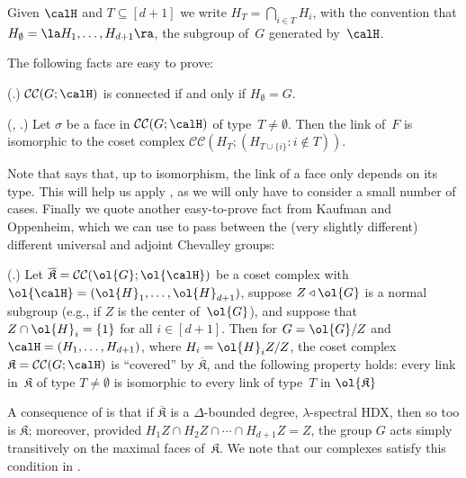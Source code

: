 \documentclass[11pt]{article}
\newcommand{\knote}[1]{}
\newcommand{\CC}[2]{\mathcal{C}\mathcal{C}(#1;#2)}
\newcommand{\complex}{\mathfrak{K}}
\begin{document}
\begin{definition}
    Given $\calH$ and $T \subseteq [d+1]$ we write $H_T = \bigcap_{i \in T} H_i$, with the convention that $H_\emptyset = \la H_1, \dots, H_{d+1} \ra$, the subgroup of~$G$ generated by~$\calH$.
\end{definition}
The following facts are easy to prove:
\begin{fact}                                        \label{fact:connected}
    (\cite{AH93}.)
    $\CC{G}{\calH}$ is connected  if and only if $H_\emptyset = G$.
\end{fact}
\begin{fact}                                        \label{fact:link}
    (\cite[p.~13]{Gar79}, \cite{HS19}.)
    Let $\sigma$ be a face in $\CC{G}{\calH}$ of type~$T \neq \emptyset$.
    Then the link of~$F$ is isomorphic to the coset complex $\CC{H_T}{(H_{T \cup \{i\}} : i \not \in T)}$.
\end{fact}
Note that  says that, up to isomorphism, the link of a face only depends on its type. This will help us apply , as we will only have to consider a small number of cases.
Finally we quote another easy-to-prove fact from Kaufman and Oppenheim, which we can use to pass between the (very slightly different) different universal and adjoint Chevalley groups:
\begin{fact}                                     \label{fact:ko2.4}
    (\cite[essentially Prop.~2.12]{KO18}.)
    Let $\overline{\complex} = \CC{\ol{G}}{\ol{\calH}}$ be a coset complex with $\ol{\calH} = (\ol{H}_1, \dots, \ol{H}_{d+1})$, suppose $Z \triangleleft \ol{G}$ is a normal subgroup (e.g., if $Z$ is the center of~$\ol{G}$), and suppose that $Z \cap \ol{H}_i = \{1\}$ for all $i \in [d+1]$.
    Then for $G = \ol{G} / Z$ and $\calH= (H_1, \dots, H_{d+1})$, where $H_i = \ol{H}_i Z / Z$, the coset complex $\complex = \CC{G}{\calH}$ is ``covered'' by $\overline{\complex}$, and the following property holds: every link in~$\complex$ of type $T \neq \emptyset$ is isomorphic to every link of type~$T$ in $\ol{\complex}$
\end{fact}
\begin{remark}  \label{rem:get-to-adjoint}
    A consequence of  is that if $\overline{\complex}$ is a $\Delta$-bounded degree, $\lambda$-spectral HDX, then so too is $\complex$; moreover, provided $H_1 Z \cap H_2 Z \cap \cdots \cap H_{d+1} Z = Z$, the group $G$ acts simply transitively on the maximal faces of~$\complex$. We note that our complexes satisfy this condition in .
\end{remark}
\end{document}
